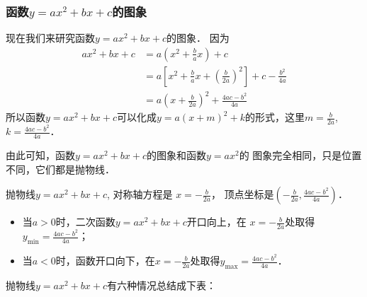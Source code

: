 \subsubsection{函数$y=ax^2+bx+c$的图象}
现在我们来研究函数$y=ax^2+bx+c$的图象．
因为
\[\begin{split}
ax^2+bx+c&=a\left(x^2+\frac{b}{a}x\right)+c\\
&=a\left[x^2+\frac{b}{a}x+\left(\frac{b}{2a}\right)^2\right]+c-\frac{b^2}{4a}\\
&=a\left(x+\frac{b}{2a}\right)^2+\frac{4ac-b^2}{4a}
\end{split}\]    
所以函数$y=ax^2+bx+c$可以化成$y=a(x+m)^2+k$的形式，这里$m=\frac{b}{2a}$, $k=\frac{4ac-b^2}{4a}$．

由此可知，函数$y=ax^2+bx+c$的图象和函数$y=ax^2$的
图象完全相同，只是位置不同，它们都是抛物线．

抛物线$y=ax^2+bx+c$, 对称轴方程是
$x=-\frac{b}{2a}$，
顶点坐标是$\left(-\frac{b}{2a},\frac{4ac-b^2}{4a}\right)$．
\begin{itemize}
    \item 当$a>0$时，二次函数$y=ax^2+bx+c$开口向上，在
$x=-\frac{b}{2a}$处取得$y_{\min}=\frac{4ac-b^2}{4a}$；
\item 当$a<0$时，函数开口向下，在$x=-\frac{b}{2a}$处取得$y_{\max}=\frac{4ac-b^2}{4a}$．
\end{itemize}

抛物线$y=ax^2+bx+c$有六种情况总结成下表：

